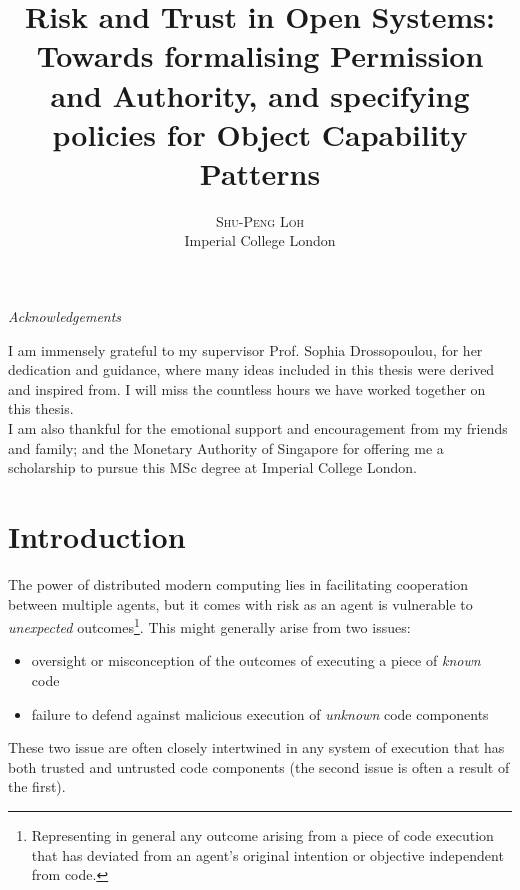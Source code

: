 \documentclass[a4paper,11pt,twoside]{article}
\title{Risk and Trust in Open Systems:\\ \Large Towards formalising Permission and Authority, and specifying policies for Object Capability Patterns} %
\author{%
\textsc{Shu-Peng Loh} \\[1ex] %
\normalsize Imperial College London \\ %
}
\date{} %
\begin{document}
\let\sf\textsf

\raggedbottom
\thispagestyle{empty}
\tableofcontents
\thispagestyle{empty}
\clearpage
\thispagestyle{empty}
\begin{minipage}{\textwidth}
\begin{center}
\textit{Acknowledgements}
\end{center}
\small
I am immensely grateful to my supervisor Prof. Sophia Drossopoulou, for her dedication and guidance, where many ideas included in this thesis were derived and inspired from. I will miss the countless hours we have worked together on this thesis.\\

I am also thankful for the emotional support and encouragement from my friends and family; and the Monetary Authority of Singapore for offering me a scholarship to pursue this MSc degree at Imperial College London.
\end{minipage}
\maketitle
\setcounter{page}{1}
\pagestyle{fancy} %


\section{Introduction}
The power of distributed modern computing lies in facilitating cooperation between multiple agents, but it comes with risk as an agent is vulnerable to \textit{unexpected} outcomes\footnote{Representing in general any outcome arising from a piece of code execution that has deviated from an agent's original intention or objective independent from code.}. This might generally arise from two issues: 
\begin{itemize}
\item oversight or misconception of the outcomes of executing a piece of \textit{known} code
\item failure to defend against malicious execution of \textit{unknown} code components\end{itemize}
\noindent These two issue are often closely intertwined in any system of execution that has both trusted and untrusted code components (the second issue is often a result of the first).\\
\end{document}
